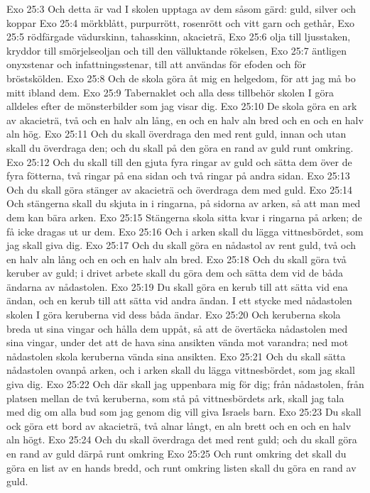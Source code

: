Exo 25:3  Och detta är vad I skolen upptaga av dem såsom gärd: guld, silver och koppar
Exo 25:4  mörkblått, purpurrött, rosenrött och vitt garn och gethår,
Exo 25:5  rödfärgade vädurskinn, tahasskinn, akacieträ,
Exo 25:6  olja till ljusstaken, kryddor till smörjelseoljan och till den välluktande rökelsen,
Exo 25:7  äntligen onyxstenar och infattningsstenar, till att användas för efoden och för bröstskölden.
Exo 25:8  Och de skola göra åt mig en helgedom, för att jag må bo mitt ibland dem.
Exo 25:9  Tabernaklet och alla dess tillbehör skolen I göra alldeles efter de mönsterbilder som jag visar dig.
Exo 25:10  De skola göra en ark av akacieträ, två och en halv aln lång, en och en halv aln bred och en och en halv aln hög.
Exo 25:11  Och du skall överdraga den med rent guld, innan och utan skall du överdraga den; och du skall på den göra en rand av guld runt omkring.
Exo 25:12  Och du skall till den gjuta fyra ringar av guld och sätta dem över de fyra fötterna, två ringar på ena sidan och två ringar på andra sidan.
Exo 25:13  Och du skall göra stänger av akacieträ och överdraga dem med guld.
Exo 25:14  Och stängerna skall du skjuta in i ringarna, på sidorna av arken, så att man med dem kan bära arken.
Exo 25:15  Stängerna skola sitta kvar i ringarna på arken; de få icke dragas ut ur dem.
Exo 25:16  Och i arken skall du lägga vittnesbördet, som jag skall giva dig.
Exo 25:17  Och du skall göra en nådastol av rent guld, två och en halv aln lång och en och en halv aln bred.
Exo 25:18  Och du skall göra två keruber av guld; i drivet arbete skall du göra dem och sätta dem vid de båda ändarna av nådastolen.
Exo 25:19  Du skall göra en kerub till att sätta vid ena ändan, och en kerub till att sätta vid andra ändan. I ett stycke med nådastolen skolen I göra keruberna vid dess båda ändar.
Exo 25:20  Och keruberna skola breda ut sina vingar och hålla dem uppåt, så att de övertäcka nådastolen med sina vingar, under det att de hava sina ansikten vända mot varandra; ned mot nådastolen skola keruberna vända sina ansikten.
Exo 25:21  Och du skall sätta nådastolen ovanpå arken, och i arken skall du lägga vittnesbördet, som jag skall giva dig.
Exo 25:22  Och där skall jag uppenbara mig för dig; från nådastolen, från platsen mellan de två keruberna, som stå på vittnesbördets ark, skall jag tala med dig om alla bud som jag genom dig vill giva Israels barn.
Exo 25:23  Du skall ock göra ett bord av akacieträ, två alnar långt, en aln brett och en och en halv aln högt.
Exo 25:24  Och du skall överdraga det med rent guld; och du skall göra en rand av guld därpå runt omkring
Exo 25:25  Och runt omkring det skall du göra en list av en hands bredd, och runt omkring listen skall du göra en rand av guld.
